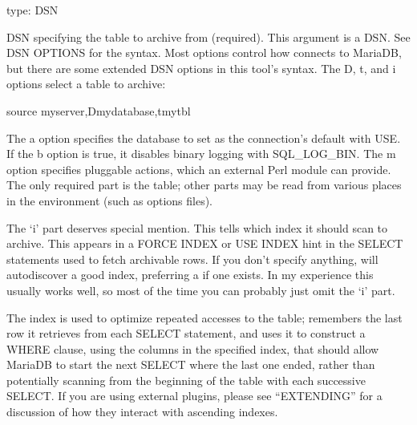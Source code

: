 \documentclass[letterpaper,10pt,english]{sphinxmanual}
\begin{document}
\begin{fulllineitems}
\label{\detokenize{mariadb-archiver:cmdoption-mariadb-archiver-source}}
type: DSN

DSN specifying the table to archive from (required).  This argument is a DSN.
See DSN OPTIONS for the syntax.  Most options control how 
connects to MariaDB, but there are some extended DSN options in this tool’s
syntax.  The D, t, and i options select a table to archive:

\begin{sphinxVerbatim}[commandchars=\\\{\}]
\PYGZhy{}\PYGZhy{}source my\PYGZus{}server,Dmy\PYGZus{}database,tmy\PYGZus{}tbl
\end{sphinxVerbatim}

The a option specifies the database to set as the connection’s default with USE.
If the b option is true, it disables binary logging with SQL\_LOG\_BIN.  The m
option specifies pluggable actions, which an external Perl module can provide.
The only required part is the table; other parts may be read from various
places in the environment (such as options files).

The ‘i’ part deserves special mention.  This tells  which index
it should scan to archive.  This appears in a FORCE INDEX or USE INDEX hint in
the SELECT statements used to fetch archivable rows.  If you don’t specify
anything,  will auto\sphinxhyphen{}discover a good index, preferring a  if one exists.  In my experience this usually works well, so most of the
time you can probably just omit the ‘i’ part.

The index is used to optimize repeated accesses to the table; 
remembers the last row it retrieves from each SELECT statement, and uses it to
construct a WHERE clause, using the columns in the specified index, that should
allow MariaDB to start the next SELECT where the last one ended, rather than
potentially scanning from the beginning of the table with each successive
SELECT.  If you are using external plugins, please see “EXTENDING” for a
discussion of how they interact with ascending indexes.


\end{fulllineitems}
\end{document}
